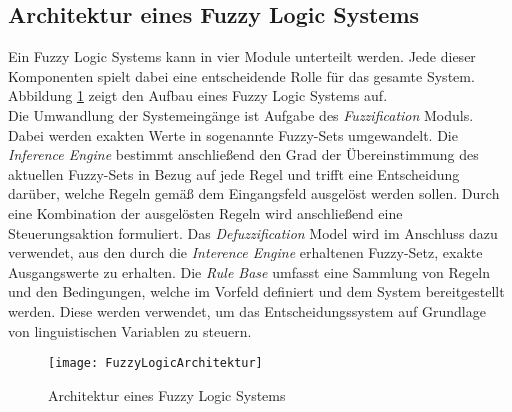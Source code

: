 \subsection{Architektur eines Fuzzy Logic Systems}
Ein Fuzzy Logic Systems kann in vier Module unterteilt werden. Jede dieser Komponenten spielt dabei eine entscheidende Rolle für das gesamte System. 
Abbildung \ref{fig:FuzzyLogicArchitektur} zeigt den Aufbau eines Fuzzy Logic Systems auf.\\
Die Umwandlung der Systemeingänge ist Aufgabe des \textit{Fuzzification} Moduls. Dabei werden exakten Werte in sogenannte Fuzzy-Sets umgewandelt. Die \textit{Inference Engine} bestimmt anschließend den Grad der Übereinstimmung des aktuellen Fuzzy-Sets in Bezug auf jede Regel und trifft eine Entscheidung darüber, welche Regeln gemäß dem Eingangsfeld ausgelöst werden sollen. Durch eine Kombination der ausgelösten Regeln wird anschließend eine Steuerungsaktion formuliert. Das \textit{Defuzzification} Model wird im Anschluss dazu verwendet, aus den durch die \textit{Interence Engine} erhaltenen Fuzzy-Setz, exakte Ausgangswerte zu erhalten.
Die \textit{Rule Base} umfasst eine Sammlung von Regeln und den  Bedingungen, welche im Vorfeld definiert und dem System bereitgestellt werden. Diese werden verwendet, um das Entscheidungssystem auf Grundlage von linguistischen Variablen zu steuern. \cite{FuzzyLogicGeeks}\\
\vspace{-1cm}
\begin{center}
    \begin{figure}[h]
     \centering
     \texttt{[image: FuzzyLogicArchitektur]}
     \caption{Architektur eines Fuzzy Logic Systems \cite{FuzzyLogicGeeks}}
     \label{fig:FuzzyLogicArchitektur}
    \end{figure}
   \end{center}

